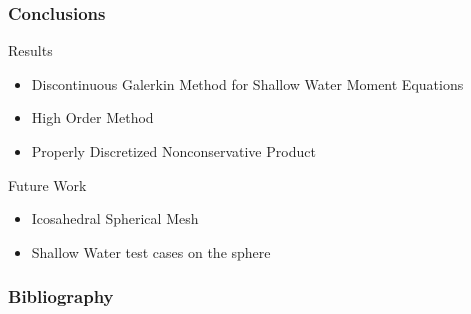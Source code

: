 \documentclass[10pt]{beamer}
\begin{document}
\begin{frame}
  \frametitle{Conclusions}
  Results
  \begin{itemize}
    \item Discontinuous Galerkin Method for Shallow Water Moment Equations
    \item High Order Method
    \item Properly Discretized Nonconservative Product
  \end{itemize}
  Future Work
  \begin{itemize}
    \item Icosahedral Spherical Mesh
    \item Shallow Water test cases on the sphere
  \end{itemize}
\end{frame}

\begin{frame}[allowframebreaks]
  \frametitle{Bibliography}
  \nocite{*}
  \printbibliography{}
\end{frame}
\end{document}
